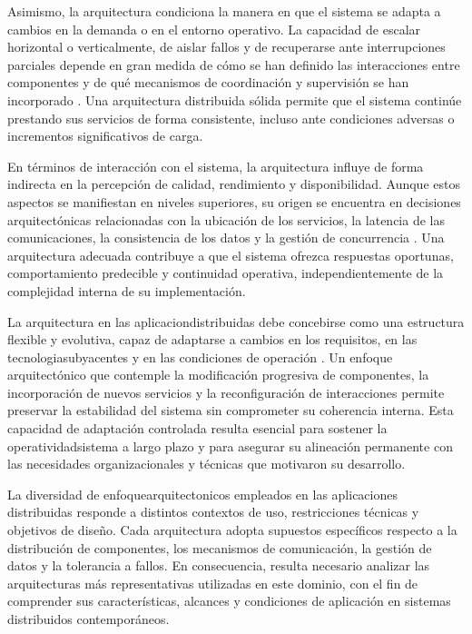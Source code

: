 				Asimismo, la arquitectura condiciona la manera en que el sistema se adapta a cambios en la demanda o en el entorno operativo. La capacidad de escalar horizontal o verticalmente, de aislar fallos y de recuperarse ante interrupciones parciales depende en gran medida de cómo se han definido las interacciones entre componentes y de qué mecanismos de coordinación y supervisión se han incorporado \cite{Kleppmann2022Designing}. Una arquitectura distribuida sólida permite que el sistema continúe prestando sus servicios de forma consistente, incluso ante condiciones adversas o incrementos significativos de carga.
				
				En términos de interacción con el sistema, la arquitectura influye de forma indirecta en la percepción de calidad, rendimiento y disponibilidad. Aunque estos aspectos se manifiestan en niveles superiores, su origen se encuentra en decisiones arquitectónicas relacionadas con la ubicación de los servicios, la latencia de las comunicaciones, la consistencia de los datos y la gestión de concurrencia \cite{Stallings2022Network}. Una arquitectura adecuada contribuye a que el sistema ofrezca respuestas oportunas, comportamiento predecible y continuidad operativa, independientemente de la complejidad interna de su implementación.
				
				La \gls{arquitectura} en las \glspl{aplicaciondistribuida} debe concebirse como una estructura flexible y evolutiva, capaz de adaptarse a cambios en los requisitos, en las \glspl{tecnologiasubyacente} y en las condiciones de operación \cite{Tanenbaum2023Distributed,Newman2021Microservices}. Un enfoque arquitectónico que contemple la modificación progresiva de \glspl{componente}, la incorporación de nuevos \glspl{servicio} y la reconfiguración de interacciones permite preservar la \gls{estabilidad} del \gls{sistema} sin comprometer su coherencia interna. Esta capacidad de adaptación controlada resulta esencial para sostener la \gls{operatividadsistema} a largo plazo y para asegurar su alineación permanente con las necesidades organizacionales y técnicas que motivaron su desarrollo.
				
				La diversidad de \glspl{enfoquearquitectonico} empleados en las aplicaciones distribuidas responde a distintos contextos de uso, restricciones técnicas y objetivos de diseño. Cada arquitectura adopta supuestos específicos respecto a la distribución de componentes, los mecanismos de comunicación, la gestión de datos y la tolerancia a fallos. En consecuencia, resulta necesario analizar las arquitecturas más representativas utilizadas en este dominio, con el fin de comprender sus características, alcances y condiciones de aplicación en sistemas distribuidos contemporáneos.
				
